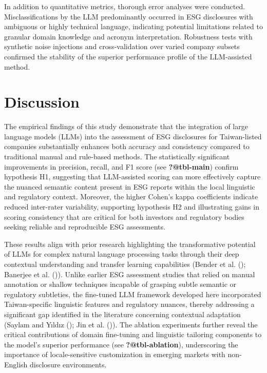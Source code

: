 \documentclass[
  12pt,
]{article}
\begin{document}
In addition to quantitative metrics, thorough error analyses were
conducted. Misclassifications by the LLM predominantly occurred in ESG
disclosures with ambiguous or highly technical language, indicating
potential limitations related to granular domain knowledge and acronym
interpretation. Robustness tests with synthetic noise injections and
cross-validation over varied company subsets confirmed the stability of
the superior performance profile of the LLM-assisted method.

\section{Discussion}\label{discussion}

The empirical findings of this study demonstrate that the integration of
large language models (LLMs) into the assessment of ESG disclosures for
Taiwan-listed companies substantially enhances both accuracy and
consistency compared to traditional manual and rule-based methods. The
statistically significant improvements in precision, recall, and F1
score (see \textbf{?@tbl-main}) confirm hypothesis H1, suggesting that
LLM-assisted scoring can more effectively capture the nuanced semantic
content present in ESG reports within the local linguistic and
regulatory context. Moreover, the higher Cohen's kappa coefficients
indicate reduced inter-rater variability, supporting hypothesis H2 and
illustrating gains in scoring consistency that are critical for both
investors and regulatory bodies seeking reliable and reproducible ESG
assessments.

These results align with prior research highlighting the transformative
potential of LLMs for complex natural language processing tasks through
their deep contextual understanding and transfer learning capabilities
(Bender et al. (); Banerjee et al.
()). Unlike earlier ESG assessment
studies that relied on manual annotation or shallow techniques incapable
of grasping subtle semantic or regulatory subtleties, the fine-tuned LLM
framework developed here incorporated Taiwan-specific linguistic
features and regulatory nuances, thereby addressing a significant gap
identified in the literature concerning contextual adaptation (Saylam
and Yıldız (); Jin et al.
()). The ablation experiments further reveal
the critical contributions of domain fine-tuning and linguistic
tailoring components to the model's superior performance (see
\textbf{?@tbl-ablation}), underscoring the importance of
locale-sensitive customization in emerging markets with non-English
disclosure environments.
\end{document}
